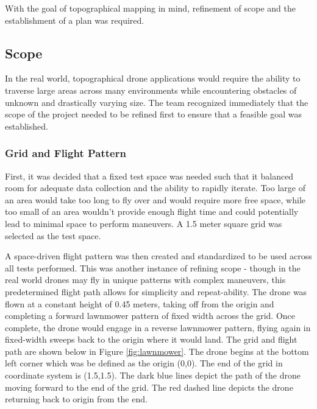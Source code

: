 
With the goal of topographical mapping in mind, refinement of scope and the establishment of a plan was required. 

\subsection{Scope}
In the real world, topographical drone applications would require the ability to traverse large areas across many environments while encountering obstacles of unknown and drastically varying size. The team recognized immediately that the scope of the project needed to be refined first to ensure that a feasible goal was established. 

\subsubsection{Grid and Flight Pattern}
First, it was decided that a fixed test space was needed such that it balanced room for adequate data collection and the ability to rapidly iterate. Too large of an area would take too long to fly over and would require more free space, while too small of an area wouldn't provide enough flight time and could potentially lead to minimal space to perform maneuvers. A 1.5 meter square grid was selected as the test space.

A space-driven flight pattern was then created and standardized to be used across all tests performed. This was another instance of refining scope - though in the real world drones may fly in unique patterns with complex maneuvers, this predetermined flight path allows for simplicity and repeat-ability. The drone was flown at a constant height of 0.45 meters, taking off from the origin and completing a forward lawnmower pattern of fixed width across the grid. Once complete, the drone would engage in a reverse lawnmower pattern, flying again in fixed-width sweeps back to the origin where it would land. The grid and flight path are shown below in Figure \ref{fig:lawnmower}. The
drone begins at the bottom left corner which was be defined as the origin (0,0). The end of the grid in coordinate system
is (1.5,1.5). The dark blue lines depict the path of the drone moving forward to the end of the grid. The red dashed line depicts the drone returning back to origin from the end.


